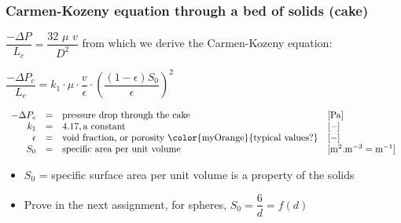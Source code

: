 \begin{frame}\frametitle{Carmen-Kozeny equation through a bed of solids (cake)}
	$\dfrac{-\Delta P}{L_c} = \dfrac{32\,\, \mu\,\, v}{D^2} \label{P}$ {\small from which we derive the Carmen-Kozeny equation:}
	\begin{exampleblock}{}
		$\dfrac{-\Delta P_c}{L_c} = k_1 \cdot \mu \cdot \dfrac{v}{\epsilon} \cdot \left( \dfrac{(1-\epsilon)S_0}{\epsilon} \right)^2$
	\end{exampleblock}
	\[
		\begin{array}{rcll}
			-\Delta P_c&=& \text{pressure drop through the cake}&[\text{Pa}]\\
			k_1	    &=& 4.17, \text{a constant}                     	&[-]\\
			\epsilon&=& \text{void fraction, or porosity {\color{myOrange}{typical values?}}}				&[-]\\
			S_0   	&=& \text{specific area per unit volume}			&[\text{m}^2\text{.m}^{-3} = \text{m}^{-1}]
		\end{array}
	\]
	\begin{itemize}
		\item	$S_0$ = specific surface area per unit volume is a property of the solids
		\item	Prove in the next assignment, for spheres, $S_0 = \dfrac{6}{d} = f(d)$
	\end{itemize}
\end{frame}

